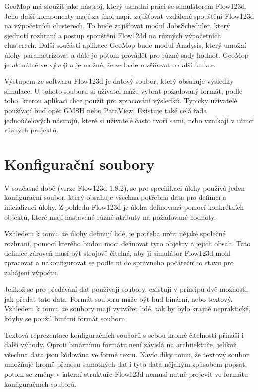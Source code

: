 \documentclass[FM,bw,DP]{tulthesis}
\begin{document}
GeoMop má sloužit jako nástroj, který usnadní práci se simulátorem Flow123d. Jeho další komponenty mají za úkol např. zajišťovat vzdálené spouštění Flow123d na výpočetních clusterech. To bude zajišťovat modul JobsScheduler, který sjednotí rozhraní a postup spouštění Flow123d na různých výpočetních clusterech. Další součástí aplikace GeoMop bude modul Analysis, který umožní úlohy parametrizovat a dále je potom provádět pro různé sady hodnot. GeoMop je aktuálně ve vývoji a je možné, že se bude rozšiřovat o další funkce.

Výstupem ze softwaru Flow123d je datový soubor, který obsahuje výsledky simulace. U tohoto souboru si uživatel může vybrat požadovaný formát, podle toho, kterou aplikaci chce použít pro zpracování výsledků. Typicky uživatelé používají buď opět GMSH nebo ParaView. Existuje také celá řada jednoúčelových nástrojů, které si uživatelé často tvoří sami, nebo vznikají v rámci různých projektů.

\section{Konfigurační soubory}

V současné době (verze Flow123d 1.8.2), se pro specifikaci úlohy používá jeden konfigurační soubor, který obsahuje všechna potřebná data pro definici a inicializaci úlohy. Z pohledu Flow123d je úloha definovaná pomocí konkrétních objektů, které mají nastavené různé atributy na požadované hodnoty. 

Vzhledem k tomu, že úlohy definují lidé, je potřeba určit nějaké společné rozhraní, pomocí kterého budou moci definovat tyto objekty a jejich obsah. Tato definice zároveň musí být strojově čitelná, aby ji simulátor Flow123d mohl zpracovat a nakonfigurovat se podle ní do správného počátečního stavu pro zahájení výpočtu.

Jelikož se pro předávání dat používají soubory, existují v principu dvě možnosti, jak předat tato data. Formát souboru může být buď binární, nebo textový. Vzhledem k tomu, že soubory mají vytvářet lidé, tak by bylo krajně nepraktické, kdyby se použil binární formát souboru.

Textová reprezentace konfiguračních souborů s sebou kromě čitelnosti přináší i další výhody. Oproti binárnímu formátu není závislá na architektuře, jelikož všechna data jsou kódována ve formě textu. Navíc díky tomu, že textový soubor umožňuje kromě přenosu samotných dat i tyto data nějakým způsobem popsat, potom se změny v interní struktuře Flow123d nemusí nutně projevit ve formátu konfiguračních souborů.
\end{document}
